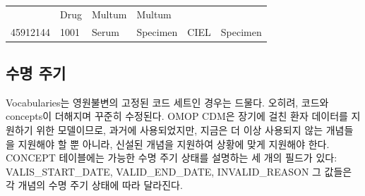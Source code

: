 \documentclass[11pt]{book}
\theoremstyle{definition}
\theoremstyle{definition}
\theoremstyle{definition}
\theoremstyle{remark}
\begin{document}
\begin{longtable}[]{@{}llllll@{}}
\begin{minipage}[t]{0.16\columnwidth}
\end{minipage} & \begin{minipage}[t]{0.14\columnwidth}\raggedright\strut
Drug\strut
\end{minipage} & \begin{minipage}[t]{0.14\columnwidth}\raggedright\strut
Multum\strut
\end{minipage} & \begin{minipage}[t]{0.14\columnwidth}\raggedright\strut
Multum\strut
\end{minipage}\tabularnewline
\begin{minipage}[t]{0.13\columnwidth}\raggedright\strut
45912144\strut
\end{minipage} & \begin{minipage}[t]{0.07\columnwidth}\raggedright\strut
1001\strut
\end{minipage} & \begin{minipage}[t]{0.16\columnwidth}\raggedright\strut
Serum\strut
\end{minipage} & \begin{minipage}[t]{0.14\columnwidth}\raggedright\strut
Specimen\strut
\end{minipage} & \begin{minipage}[t]{0.14\columnwidth}\raggedright\strut
CIEL\strut
\end{minipage} & \begin{minipage}[t]{0.14\columnwidth}\raggedright\strut
Specimen\strut
\end{minipage}\tabularnewline
\bottomrule
\end{longtable}

\subsection{수명 주기}\label{conceptLifeCycle}

Vocabularies는 영원불변의 고정된 코드 세트인 경우는 드물다. 오히려,
코드와 concepts이 더해지며 꾸준히 수정된다. OMOP CDM은 장기에 걸친 환자
데이터를 지원하기 위한 모델이므로, 과거에 사용되었지만, 지금은 더 이상
사용되지 않는 개념들을 지원해야 할 뿐 아니라, 신설된 개념을 지원하여
상황에 맞게 지원해야 한다. CONCEPT 테이블에는 가능한 수명 주기 상태를
설명하는 세 개의 필드가 있다: VALIS\_START\_DATE, VALID\_END\_DATE,
INVALID\_REASON 그 값들은 각 개념의 수명 주기 상태에 따라 달라진다.
\end{document}
